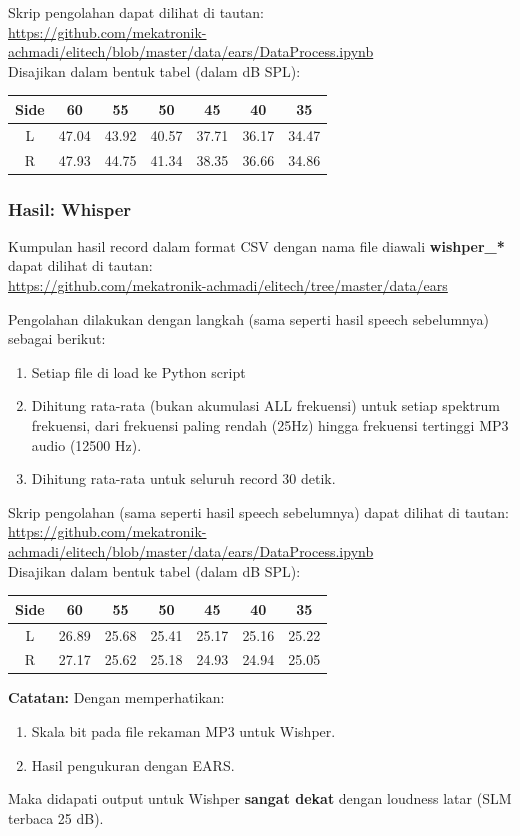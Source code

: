 \documentclass[12pt,]{article}
\begin{document}
	Skrip pengolahan dapat dilihat di tautan:\\
	\url{https://github.com/mekatronik-achmadi/elitech/blob/master/data/ears/DataProcess.ipynb}\\

	Disajikan dalam bentuk tabel (dalam dB SPL):
	\begin{center}
		\begin{tabular}{|c|c|c|c|c|c|c|}
			\hline
			Side & 60 & 55 & 50 & 45 & 40 & 35\\ [0.5ex]
			\hline\hline
			L & 47.04 & 43.92 & 40.57 & 37.71 & 36.17 & 34.47 \\
			\hline
			R & 47.93 & 44.75 & 41.34 & 38.35 & 36.66 & 34.86 \\
			\hline
		\end{tabular}
	\end{center}

	\newpage
	\subsubsection{Hasil: Whisper}

	Kumpulan hasil record dalam format CSV dengan nama file diawali \textbf{wishper\_*} dapat dilihat di tautan:\\
	\url{https://github.com/mekatronik-achmadi/elitech/tree/master/data/ears}

	Pengolahan dilakukan dengan langkah (sama seperti hasil speech sebelumnya) sebagai berikut:
	\begin{enumerate}
		\item Setiap file di load ke Python script
		\item Dihitung rata-rata (bukan akumulasi ALL frekuensi) untuk setiap spektrum frekuensi,
		dari frekuensi paling rendah (25Hz) hingga frekuensi tertinggi MP3 audio (12500 Hz).
		\item Dihitung rata-rata untuk seluruh record 30 detik.
	\end{enumerate}

	Skrip pengolahan (sama seperti hasil speech sebelumnya) dapat dilihat di tautan:\\
	\url{https://github.com/mekatronik-achmadi/elitech/blob/master/data/ears/DataProcess.ipynb}\\

	Disajikan dalam bentuk tabel (dalam dB SPL):
	\begin{center}
		\begin{tabular}{|c|c|c|c|c|c|c|}
			\hline
			Side & 60 & 55 & 50 & 45 & 40 & 35\\ [0.5ex]
			\hline\hline
			L & 26.89 & 25.68 & 25.41 & 25.17 & 25.16 & 25.22 \\
			\hline
			R & 27.17 & 25.62 & 25.18 & 24.93 & 24.94 & 25.05 \\
			\hline
		\end{tabular}
	\end{center}

	\textbf{Catatan:} Dengan memperhatikan:
	\begin{enumerate}
		\item Skala bit pada file rekaman MP3 untuk Wishper.
		\item Hasil pengukuran dengan EARS.
	\end{enumerate}

	Maka didapati output untuk Wishper \textbf{sangat dekat} dengan loudness latar (SLM terbaca 25 dB).
	
\end{document}
